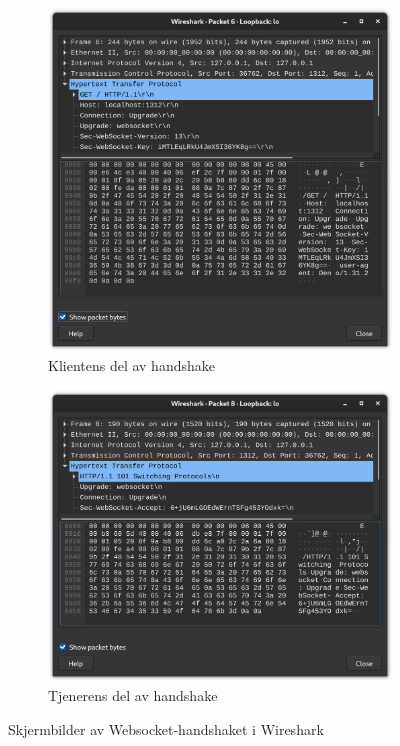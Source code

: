 \documentclass{article}
\begin{document}
\begin{figure}[ht]
    \begin{subfigure}{.48\linewidth}
        \centering
        \includegraphics*[width=\linewidth]{illustrasjoner/WS_handshake_klient.png}
        \caption{Klientens del av handshake}
    \end{subfigure}
    \hfill
    \begin{subfigure}{.48\linewidth}
        \centering
        \includegraphics*[width=\linewidth]{illustrasjoner/WS_handshake_tjener.png}
        \caption{Tjenerens del av handshake}
    \end{subfigure}
    \caption{Skjermbilder av Websocket-handshaket i Wireshark}
    \label{fig:ws_handshake}
\end{figure}
\end{document}
